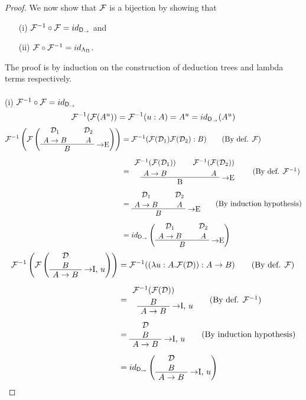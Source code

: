 \begin{proof}
\noindent We now show that $\mathcal{F}$ is a bijection by showing that
\begin{itemize}
\item[(i)] $\mathcal{F}^{-1} \circ \mathcal{F} = id_{\mathsf{D}_\to}$ and
\item[(ii)] $\mathcal{F} \circ \mathcal{F}^{-1} = id_{\Lambda_\Pi}$.
\end{itemize}
The proof is by induction on the construction of deduction trees and lambda
terms respectively.\\
\\
\noindent (i) $\mathcal{F}^{-1} \circ \mathcal{F} = id_{\mathsf{D}_\to}$
\[
\mathcal{F}^{-1}(\mathcal{F}(A^u)) = \mathcal{F}^{-1}(u:A) = A^u = id_{\mathsf{D}_\to}(A^u)
\]
\begin{align*}
\chmapanta\left(\chmap\left(
  \AxiomC{$\mathcal{D}_1$}
  \noLine
  \UnaryInfC{$A \to B$}
  \AxiomC{$\mathcal{D}_2$}
  \noLine
  \UnaryInfC{$A$}
  \RightLabel{$\to$E}
  \BinaryInfC{$B$}
  \DisplayProof
\right)\right)
& =
  \chmapanta(\chmap(\mathcal{D}_1) \chmap(\mathcal{D}_2): B)
  \tag{By def. $\chmap$} \\[6pt]
& =
  \AxiomC{$\chmapanta(\chmap(\mathcal{D}_1))$}
  \noLine
  \UnaryInfC{$A \to B$}
  \AxiomC{$\chmapanta(\chmap(\mathcal{D}_2))$}
  \noLine
  \UnaryInfC{$A$}
  \RightLabel{$\to$E}
  \BinaryInfC{B}
  \DisplayProof \tag{By def. $\chmapanta$} \\[6pt]
& =
  \AxiomC{$\mathcal{D}_1$}
  \noLine
  \UnaryInfC{$A \to B$}
  \AxiomC{$\mathcal{D}_2$}
  \noLine
  \UnaryInfC{$A$}
  \RightLabel{$\to$E}
  \BinaryInfC{$B$}
  \DisplayProof \tag{By induction hypothesis} \\[6pt]
& =
  id_{\npiproofs}\left(
  \AxiomC{$\mathcal{D}_1$}
  \noLine
  \UnaryInfC{$A \to B$}
  \AxiomC{$\mathcal{D}_2$}
  \noLine
  \UnaryInfC{$A$}
  \RightLabel{$\to$E}
  \BinaryInfC{$B$}
  \DisplayProof
  \right)
\end{align*}
\begin{align*}
\chmapanta\left(\chmap\left(
  \AxiomC{$\mathcal{D}$}
  \noLine
  \UnaryInfC{$B$}
  \RightLabel{$\to$I, $u$}
  \UnaryInfC{$A \to B$}
  \DisplayProof
\right)\right)
& =
  \chmapanta((\lambda u: A.\chmap(\mathcal{D})): A \to B)
  \tag{By def. $\chmap$} \\[6pt]
& =
  \AxiomC{$\chmapanta(\chmap(\mathcal{D}))$}
  \noLine
  \UnaryInfC{$B$}
  \RightLabel{$\to$I, $u$}
  \UnaryInfC{$A \to B$}
  \DisplayProof \tag{By def. $\chmapanta$} \\[6pt]
& =
  \AxiomC{$\mathcal{D}$}
  \noLine
  \UnaryInfC{$B$}
  \RightLabel{$\to$I, $u$}
  \UnaryInfC{$A \to B$}
  \DisplayProof \tag{By induction hypothesis} \\[6pt]
& =
  id_{\npiproofs}\left(
  \AxiomC{$\mathcal{D}$}
  \noLine
  \UnaryInfC{$B$}
  \RightLabel{$\to$I, $u$}
  \UnaryInfC{$A \to B$}
  \DisplayProof
  \right)
\end{align*}


\end{proof}
